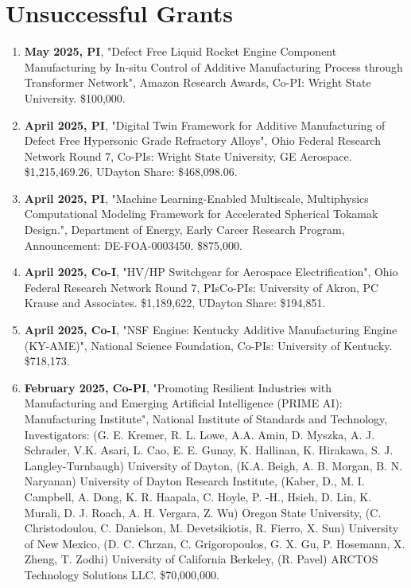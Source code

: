 \documentclass[11pt, letterpaper]{article}
\begin{document}
\section{Unsuccessful Grants}
    \begin{enumerate}[label=\arabic*., itemsep=-1pt, topsep=2pt]
        \item \textbf{May 2025, PI}, "Defect Free Liquid Rocket Engine Component Manufacturing by In-situ Control of Additive Manufacturing Process through Transformer Network", Amazon Research Awards, Co-PI: Wright State University. \$100,000.
        \item \textbf{April 2025, PI}, "Digital Twin Framework for Additive Manufacturing of Defect Free Hypersonic Grade Refractory Alloys", Ohio Federal Research Network Round 7, Co-PIs: Wright State University, GE Aerospace. \$1,215,469.26, UDayton Share: \$468,098.06.
        \item \textbf{April 2025, PI}, "Machine Learning-Enabled Multiscale, Multiphysics Computational Modeling Framework for Accelerated Spherical Tokamak Design.", Department of Energy, Early Career Research Program, Announcement: DE-FOA-0003450. \$875,000.
        \item \textbf{April 2025, Co-I}, "HV/HP Switchgear for Aerospace Electrification", Ohio Federal Research Network Round 7, PIs\/Co-PIs: University of Akron, PC Krause and Associates. \$1,189,622, UDayton Share: \$194,851.
        \item \textbf{April 2025, Co-I}, "NSF Engine: Kentucky Additive Manufacturing Engine (KY-AME)", National Science Foundation, Co-PIs: University of Kentucky. \$718,173.
        \item \textbf{February 2025, Co-PI}, "Promoting Resilient Industries with Manufacturing and Emerging Artificial Intelligence (PRIME AI): Manufacturing Institute", National Institute of Standards and Technology, Investigators: (G. E. Kremer, R. L. Lowe, A.A. Amin, D. Myszka, A. J. Schrader, V.K. Asari, L. Cao, E. E. Gunay, K. Hallinan, K. Hirakawa, S. J. Langley-Turnbaugh) University of Dayton, (K.A. Beigh, A. B. Morgan, B. N. Naryanan) University of Dayton Research Institute, (Kaber, D., M. I. Campbell, A. Dong, K. R. Haapala, C. Hoyle, P. -H., Hsieh, D. Lin, K. Murali, D. J. Roach, A. H. Vergara, Z. Wu) Oregon State University, (C. Christodoulou, C. Danielson, M. Devetsikiotis, R. Fierro, X. Sun) University of New Mexico, (D. C. Chrzan, C. Grigoropoulos, G. X. Gu, P. Hosemann, X. Zheng, T. Zodhi) University of California Berkeley, (R. Pavel) ARCTOS Technology Solutions LLC. \$70,000,000.

\end{enumerate}
\end{document}
